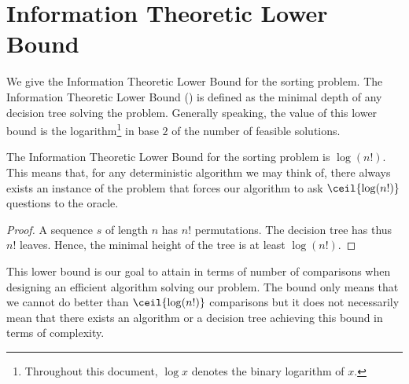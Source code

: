 \section{Information Theoretic Lower Bound}
\label{tree:sorting:ITLB}

We give the Information Theoretic Lower Bound for the sorting problem. The
Information Theoretic Lower Bound (\ITLB) is defined as the minimal depth of any
decision tree solving the problem. Generally speaking, the value of this lower
bound is the logarithm\footnote{Throughout this document, \(\log x\) denotes the binary logarithm of \(x\).}
in base \(2\) of the number of feasible solutions.
\begin{theorem}
The Information Theoretic Lower Bound for the sorting problem is
\(\log(n!)\). This means that, for any deterministic algorithm we may think of,
there always exists an instance of the problem that forces our
algorithm to ask \(\ceil{\log(n!)}\) questions to the oracle.
\end{theorem}
\begin{proof}
A sequence \(s\) of length \(n\) has \(n!\) permutations. The decision tree has thus
\(n!\) leaves. Hence, the minimal height of the tree is at least \(\log(n!)\).
\end{proof}

This lower bound is our goal to attain in terms of number of comparisons
when designing an efficient algorithm solving our problem. The bound only means
that we cannot do better than \(\ceil{\log(n!)}\) comparisons but it does not
necessarily mean that there exists an algorithm or a decision tree achieving
this bound in terms of complexity.
